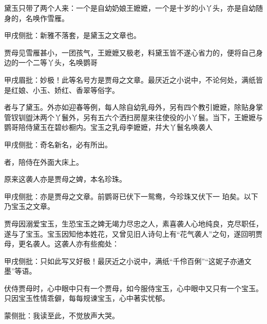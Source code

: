 \begin{parag}
    黛玉只带了两个人来：一个是自幼奶娘王嬷嬷，一个是十岁的小丫头，亦是自幼随身的，名唤作雪雁。\begin{note}甲戌侧批：新雅不落套，是黛玉之文章也。\end{note}贾母见雪雁甚小，一团孩气，王嬷嬷又极老，料黛玉皆不遂心省力的，便将自己身边的一个二等丫头，名唤鹦哥\begin{note}甲戌眉批：妙极！此等名号方是贾母之文章。最厌近之小说中，不论何处，满纸皆是红娘、小玉、娇红、香翠等俗字。\end{note}者与了黛玉。外亦如迎春等例，每人除自幼乳母外，另有四个教引嬷嬷，除贴身掌管钗钏盥沐两个丫鬟外，另有五六个洒扫房屋来往使役的小丫鬟。当下，王嬷嬷与鹦哥陪侍黛玉在碧纱橱内。宝玉之乳母李嬷嬷，幷大丫鬟名唤袭人\begin{note}甲戌侧批：奇名新名，必有所出。\end{note}者，陪侍在外面大床上。
\end{parag}


\begin{parag}
    原来这袭人亦是贾母之婢，本名珍珠。\begin{note}甲戌侧批：亦是贾母之文章。前鹦哥已伏下一鸳鸯，今珍珠又伏下一  珀矣。以下乃宝玉之文章。\end{note}贾母因溺爱宝玉，生恐宝玉之婢无竭力尽忠之人，素喜袭人心地纯良，克尽职任，遂与了宝玉。宝玉因知他本姓花，又曾见旧人诗句上有“花气袭人”之句，遂回明贾母，更名袭人。这袭人亦有些痴处：\begin{note}甲戌侧批：只如此写又好极！最厌近之小说中，满纸“千伶百俐”“这妮子亦通文墨”等语。\end{note}伏侍贾母时，心中眼中只有一个贾母，如今服侍宝玉，心中眼中又只有一个宝玉。只因宝玉性情乖僻，每每规谏宝玉，心中著实忧郁。\begin{note}蒙侧批：我读至此，不觉放声大哭。\end{note}
\end{parag}


